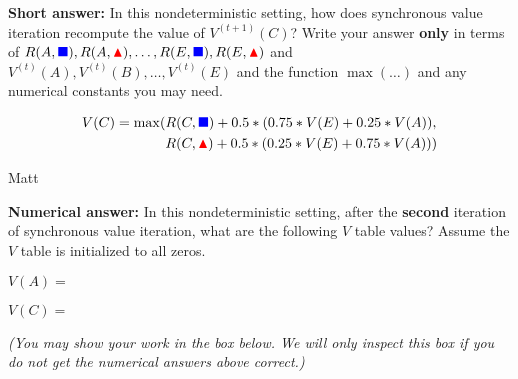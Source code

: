 \begin{parts}
\begin{subparts}
\subpart[2] \textbf{Short answer:} In this nondeterministic setting, how does synchronous value iteration recompute the value of $V^{(t+1)}(C)$? Write your answer \textbf{only} in terms of $R(A, \text{\color{blue}$\blacksquare$}), R(A, \text{\color{red}$\blacktriangle$}), \ldots, R(E, \text{\color{blue}$\blacksquare$}), R(E, \text{\color{red}$\blacktriangle$})$ and $V^{(t)}(A), V^{(t)}(B), \ldots, V^{(t)}(E)$ and the function $\max(\ldots)$ and any numerical constants you may need. 
    \begin{tcolorbox}[fit,height=2cm, width=15cm, blank, borderline={1pt}{-2pt}]
    \end{tcolorbox}
    \begin{soln}
    \begin{align*}
    V(C) = \max(  
    & R(C, \text{\color{blue}$\blacksquare$}) + 0.5 * (0.75 * V(E) + 0.25 * V(A)), \\
    & R(C, \text{\color{red}$\blacktriangle$}) + 0.5 * (0.25 * V(E) + 0.75 * V(A)) )
    \end{align*}
    \end{soln}
    \begin{qauthor}    Matt    \end{qauthor}

\subpart[2] \textbf{Numerical answer:} In this nondeterministic setting, after the \textbf{second} iteration of synchronous value iteration, what are the following $V$ table values? Assume the $V$ table is initialized to all zeros.

    $V(A) = $
    \begin{tcolorbox}[fit,height=1cm, width=2cm, blank, borderline={1pt}{-2pt}, nobeforeafter]
    \end{tcolorbox}
    \hspace{2em}
    $V(C) = $
    \begin{tcolorbox}[fit,height=1cm, width=2cm, blank, borderline={1pt}{-2pt}, nobeforeafter]
    \end{tcolorbox}

    \textit{(You may show your work in the box below. We will only inspect this box if you do {not} get the numerical answers above correct.)}
    \begin{tcolorbox}[fit,height=5cm, width=15cm, blank, borderline={1pt}{-2pt}]
    \end{tcolorbox}
    

\end{subparts}
\end{parts}
